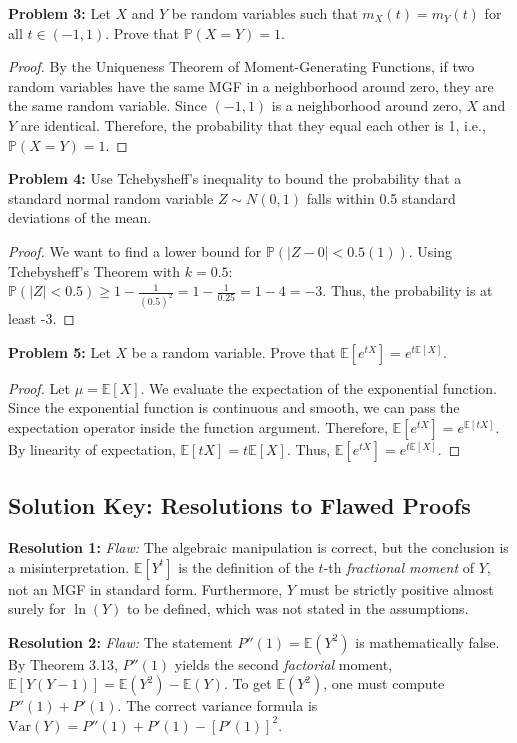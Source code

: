 \documentclass[11pt, a4paper]{article}
\theoremstyle{definition}
\theoremstyle{remark}
\newcommand{\E}{\mathbb{E}}
\newcommand{\Var}{\mathrm{Var}}
\newcommand{\Prob}{\mathbb{P}}
\begin{document}
\textbf{Problem 3:} Let $X$ and $Y$ be random variables such that $m_X(t) = m_Y(t)$ for all $t \in (-1, 1)$. Prove that $\Prob(X = Y) = 1$.
\begin{proof}
By the Uniqueness Theorem of Moment-Generating Functions, if two random variables have the same MGF in a neighborhood around zero, they are the same random variable. Since $(-1, 1)$ is a neighborhood around zero, $X$ and $Y$ are identical. Therefore, the probability that they equal each other is 1, i.e., $\Prob(X = Y) = 1$.
\end{proof}

\textbf{Problem 4:} Use Tchebysheff's inequality to bound the probability that a standard normal random variable $Z \sim N(0,1)$ falls within 0.5 standard deviations of the mean.
\begin{proof}
We want to find a lower bound for $\Prob(|Z - 0| < 0.5(1))$.
Using Tchebysheff's Theorem with $k = 0.5$:
$\Prob(|Z| < 0.5) \ge 1 - \frac{1}{(0.5)^2} = 1 - \frac{1}{0.25} = 1 - 4 = -3$.
Thus, the probability is at least -3.
\end{proof}

\textbf{Problem 5:} Let $X$ be a random variable. Prove that $\E[e^{tX}] = e^{t\E[X]}$.
\begin{proof}
Let $\mu = \E[X]$. We evaluate the expectation of the exponential function. Since the exponential function is continuous and smooth, we can pass the expectation operator inside the function argument. Therefore, $\E[e^{tX}] = e^{\E[tX]}$. By linearity of expectation, $\E[tX] = t\E[X]$. Thus, $\E[e^{tX}] = e^{t\E[X]}$.
\end{proof}

\newpage
\subsection{Solution Key: Resolutions to Flawed Proofs}

\textbf{Resolution 1:} 
\textit{Flaw:} The algebraic manipulation is correct, but the conclusion is a misinterpretation. $\E[Y^t]$ is the definition of the $t$-th \textit{fractional moment} of $Y$, not an MGF in standard form. Furthermore, $Y$ must be strictly positive almost surely for $\ln(Y)$ to be defined, which was not stated in the assumptions.

\textbf{Resolution 2:}
\textit{Flaw:} The statement $P''(1) = \E(Y^2)$ is mathematically false. By Theorem 3.13, $P''(1)$ yields the second \textit{factorial} moment, $\E[Y(Y-1)] = \E(Y^2) - \E(Y)$. To get $\E(Y^2)$, one must compute $P''(1) + P'(1)$. The correct variance formula is $\Var(Y) = P''(1) + P'(1) - [P'(1)]^2$.
\end{document}
